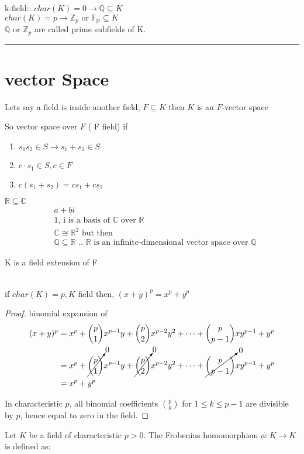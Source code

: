 \documentclass{article}
\begin{document}
k-field:: $char(K) = 0 \rightarrow \mathbb{Q } \subseteq K $ \\ 
$char(K) = p \rightarrow \mathbb{Z}_p \text{ or } \mathbb{F_p} \subseteq K$ \\ 
$\mathbb{Q}$ or $\mathbb{Z}_p$ are called prime subfields of K.  \\ 
\noindent\rule{\textwidth}{0.5pt}

\section{vector Space} 
\begin{proposition}
    Lets say a field is inside another field, $F \subseteq K$ then $K$ is an $F$-vector space 

\end{proposition}

So vector space over $F$ ( F field) if  \begin{enumerate}
    \item $s_1 s_2 \in S \rightarrow s_1 + s_2 \in S$
    \item $c\cdot s_1 \in S, c\in F$ 
    \item $c(s_1 + s_2) = cs_1 + cs_2$ 
\end{enumerate} 

$\mathbb{R} \subseteq \mathbb{C}$ 
\begin{align*} 
    & a + bi \\ 
    &\text{1, i is a basis of }\mathbb{C } \text{ over } \mathbb{R} \\ 
    &\mathbb{C} \cong \mathbb{R}^2 \text{ but then } \\ 
    &\mathbb{Q} \subseteq \mathbb{R} \text{ .. } \mathbb{R} \text{ is an infinite-dimensional vector space over } \mathbb{Q}
\end{align*}

K is a field extension of F 
\begin{proposition} \leavevmode \\ 
    if $char(K) = p, K $ field then, $(x+ y)^p = x^p + y^p$
\end{proposition}
\begin{proof}
    binomial expansion of 
    \begin{align*}
        (x + y)^p &= x^p + \binom{p}{1} x^{p-1}y + \binom{p}{2} x^{p-2}y^2 + \cdots + \binom{p}{p-1} xy^{p-1} + y^p \\
        &= x^p + \cancelto{0}{\binom{p}{1}} x^{p-1}y + \cancelto{0}{\binom{p}{2}} x^{p-2}y^2 + \cdots + \cancelto{0}{\binom{p}{p-1}} xy^{p-1} + y^p \\
        &= x^p + y^p
    \end{align*}

        In characteristic $p$, all binomial coefficients $\binom{p}{k}$ for $1 \leq k \leq p-1$ are divisible by $p$, hence equal to zero in the field.
\end{proof}
Let $K$ be a field of characteristic $p > 0$. The Frobenius homomorphism $\phi: K \to K$ is defined as:
\end{document}
